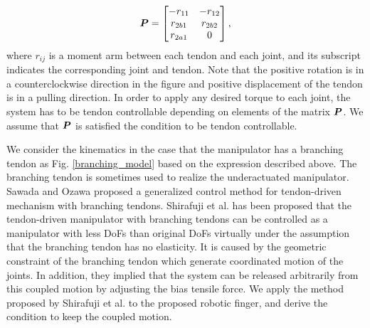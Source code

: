 \documentclass{llncs}
\def\vect#1{\mbox{\boldmath$#1$}}
\begin{document}
\begin{align}
	\vect{P}=
			\begin{bmatrix}
				-r_{11}&-r_{12}\\
				r_{2b1}&r_{2b2}\\
				r_{2a1}&0
			\end{bmatrix},
\label{jacobian_value}
\end{align}
where $r_{ij}$ is a moment arm between each tendon and each joint, and its subscript indicates the corresponding joint and tendon.
Note that the positive rotation is in a counterclockwise direction in the figure and positive displacement of the tendon is in a pulling direction.
In order to apply any desired torque to each joint, the system has to be tendon controllable depending on elements of the matrix $\vect{P}$\cite{kobayashi1998}.
We assume that $\vect{P}$ is satisfied the condition to be tendon controllable.

We consider the kinematics in the case that the manipulator has a branching tendon as Fig. \ref{branching_model} based on the expression described above.
The branching tendon is sometimes used to realize the underactuated manipulator\cite{Birglen2008}.
Sawada and Ozawa\cite{sawada2012} proposed a generalized control method for tendon-driven mechanism with branching tendons.
Shirafuji et al.\cite{Shirafuji2014b} has been proposed that the tendon-driven manipulator with branching tendons can be controlled as a manipulator with less DoFs than original DoFs virtually under the assumption that the branching tendon has no elasticity.
It is caused by the geometric constraint of the branching tendon which generate coordinated motion of the joints. 
In addition, they implied that the system can be released arbitrarily from this coupled motion by adjusting the bias tensile force.
We apply the method proposed by Shirafuji et al.\cite{Shirafuji2014b} to the proposed robotic finger, and derive the condition to keep the coupled motion.
\end{document}
